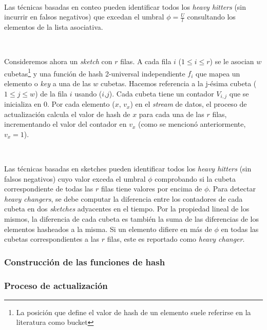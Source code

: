 \documentclass[a4paper,12pt, oneside]{article}
\begin{document}
\

Las técnicas basadas en conteo pueden identificar todos los \textit{heavy hitters} (sin incurrir en falsos negativos) que excedan el umbral $\phi = \frac{U}{l}$ consultando los elementos de la lista asociativa.

\

Consideremos ahora un \textit{sketch} con $r$ filas. A cada fila $i$ ($1 \leq i \leq r$) se le asocian $w$ cubetas\footnote{La posición que define el valor de hash de un elemento suele referirse en la literatura como bucket} y una función de hash 2-universal independiente $f_i$ que mapea un elemento o \textit{key} a una de las $w$ cubetas. Hacemos referencia a la j-ésima cubeta ($1 \leq j \leq w$) de la fila $i$ usando ($i$,$j$). Cada cubeta tiene un contador $V_{i,j}$ que se inicializa en 0. Por cada elemento ($x$, $v_x$) en el \textit{stream} de datos, el proceso de actualización calcula el valor de hash de $x$ para cada una de las $r$ filas, incrementando el valor del contador en $v_x$ (como se mencionó anteriormente, $v_x=1$).

\

Las técnicas basadas en sketches pueden identificar todos los \textit{heavy hitters} (sin falsos negativos) cuyo valor exceda el umbral $\phi$ comprobando si la cubeta correspondiente de todas las $r$ filas tiene valores por encima de $\phi$. Para detectar \textit{heavy changers}, se debe computar la diferencia entre los contadores de cada cubeta en dos \textit{sketches} adyacentes en el tiempo. Por la propiedad lineal de los mismos, la diferencia de cada cubeta es también la suma de las diferencias de los elementos hasheados a la misma. Si un elemento difiere en más de $\phi$ en todas las cubetas correspondientes a las $r$ filas, este es reportado como \textit{heavy changer}.

\subsubsection{Construcción de las funciones de hash}

\subsubsection{Proceso de actualización}
\end{document}
